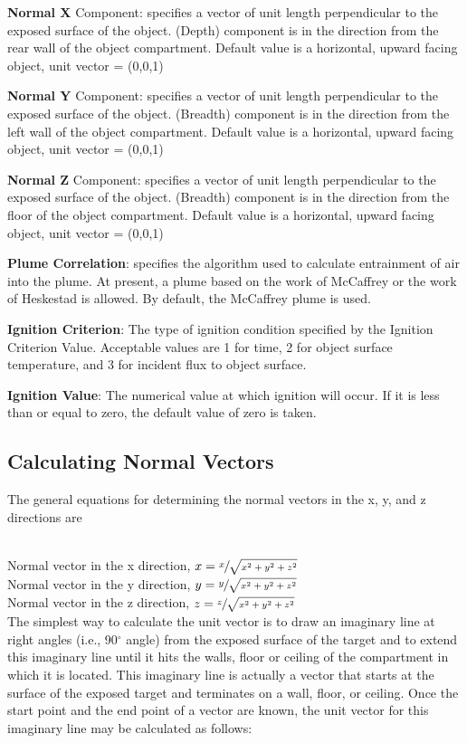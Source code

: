 \textbf{Normal  X} Component: specifies a vector of unit length perpendicular to the exposed surface of the object. (Depth) component is in the direction from the rear wall of the object compartment. Default value is a horizontal, upward facing object, unit vector = (0,0,1)

\textbf{Normal  Y} Component: specifies a vector of unit length perpendicular to the exposed surface of the object. (Breadth) component is in the direction from the left wall of the object compartment. Default value is a horizontal, upward facing object, unit vector = (0,0,1)

\textbf{Normal  Z} Component: specifies a vector of unit length perpendicular to the exposed surface of the object. (Breadth) component is in the direction from the floor of the object compartment. Default value is a horizontal, upward facing object, unit vector = (0,0,1)

\textbf{Plume Correlation}: specifies the algorithm used to calculate entrainment of air into the plume.  At present, a plume based on the work of McCaffrey or the work of Heskestad is allowed. By default, the McCaffrey plume is used.

\textbf{Ignition Criterion}: The type of ignition condition specified by the Ignition Criterion Value. Acceptable values are 1 for time, 2 for object surface temperature, and 3 for incident flux to object surface.

\textbf{Ignition Value}: The numerical value at which ignition will occur. If it is less than or equal to zero, the default value of zero is taken.

\subsection{Calculating Normal Vectors}

The general equations for determining the normal vectors in the x, y, and z directions are \\~

Normal vector in the x direction, $x = \sfrac{x}{\sqrt{x^2 + y^2 + z^2}}$ \\

Normal vector in the y direction, $y = \sfrac{y}{\sqrt{x^2 + y^2 + z^2}}$ \\

Normal vector in the z direction, $z = \sfrac{z}{\sqrt{x^2 + y^2 + z^2}}$ \\

The simplest way to calculate the unit vector is to draw an imaginary line at right angles (i.e., 90$^\circ$ angle) from the exposed surface of the target and to extend this imaginary line until it hits the walls, floor or ceiling of the compartment in which it is located.  This imaginary line is actually a vector that starts at the surface of the exposed target and terminates on a wall, floor, or ceiling.  Once the start point and the end point of a vector are known, the unit vector for this imaginary line may be calculated as follows:

